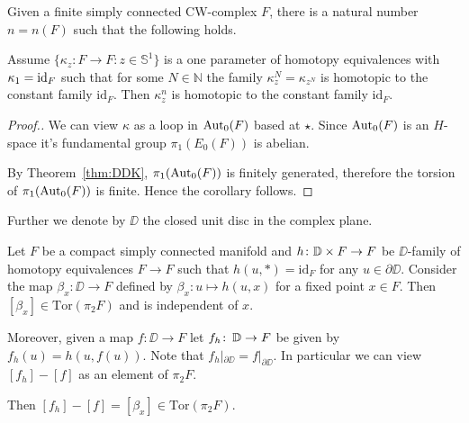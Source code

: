 \documentclass{amsart}
\begin{document}
\begin{cor}\label{cor:DDK}

Given a finite simply connected CW-complex $F$, there is a natural number $n=n(F)$ such that the following  holds.

Assume
$\{\kappa_z\colon F\to F: z\in \mathbb{S}^1\}$ is a one parameter of homotopy equivalences with $\kappa_1=\operatorname{\rm id}_F$
such that for some $N\in\mathbb{N}$ the family $\kappa^N_z=\kappa_{z^N}$ is homotopic to the constant family $\mathrm{id}_F$. 
Then $\kappa^n_z$ is homotopic to the constant family $\mathrm{id}_F$.

\end{cor}

\begin{proof}[Proof.]
We can view $\kappa$ as a loop in $\operatorname{\rm Aut}_0(F)$ based at $\star$.
Since $\operatorname{\rm Aut}_0(F)$ is an $H$-space it's fundamental group  
$\pi_1(E_0(F))$ is abelian. 

By Theorem~\ref{thm:DDK}, $\pi_1(\operatorname{\rm Aut}_0(F))$ is finitely generated,
therefore the torsion of $\pi_1(\operatorname{\rm Aut}_0(F))$ is finite.
Hence the corollary follows.
\end{proof}

Further we denote by $\DD$ the closed unit disc in the complex plane.

\begin{techlem}\label{techlem}
Let $F$ be a compact simply connected manifold and $h\colon \DD\times F\z\to F$ be 
$\DD$-family of homotopy equivalences $F\to F$ such that $h(u,*)=\mathrm{id}_F$ for any
$u\in\partial \DD$. 
Consider the map $\beta_x\colon \DD\to F$ defined by $\beta_x\colon u\mapsto h(u,x)$ for a fixed point $x\in F$. 
Then $[\beta_x]\in \mathrm{Tor}(\pi_2F)$ and is independent of $x$.

Moreover, given a map $f\colon \DD\to F$ let $f_h\colon\thinspace \mathbb{D}\to F$ be given by $f_h(u)=h(u,f(u))$.
Note that  $f_h|_{\partial \DD}=f|_{\partial \DD}$. In particular we can view $[f_h]-[f]$ as an element of $\pi_2F$.

Then 
$[f_h]-[f]=[\beta_x]\in \mathrm{Tor}(\pi_2F)$. 
\end{techlem}
\end{document}
